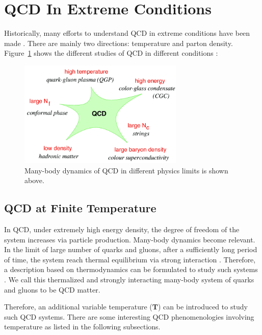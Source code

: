 \section{QCD In Extreme Conditions}

Historically, many efforts to understand QCD in extreme conditions have been made \cite{QCDExtreme}. There are mainly two directions: temperature and parton density. Figure~\ref{QCDConds} shows the different studies of QCD in different conditions \cite{QCDDiffConds}:


\begin{figure}[hbtp]
\begin{center}
\includegraphics[width=0.70\textwidth]{Figures/Chapter1/ManyBodyQCD.png}
\caption{Many-body dynamics of QCD in different physics limits is shown above.}
\label{QCDConds}
\end{center}
\end{figure} 

\subsection{QCD at Finite Temperature}

In QCD, under extremely high energy density, the degree of freedom of the system increases via particle production. Many-body dynamics become relevant. In the limit of large number of quarks and gluons, after a sufficiently long period of time, the system reach thermal equilibrium via strong interaction \cite{MLBThermal,ADSCFTThermal,QCDThermal}. Therefore, a description based on thermodynamics can be formulated to study such systems \cite{QCDThemDyn}. We call this thermalized and strongly interacting many-body system of quarks and gluons to be QCD matter.

Therefore, an additional variable temperature ($\mathbf{T}$) can be introduced to study such QCD systems. There are some interesting QCD phenomenologies involving temperature as listed in the following subsections.

